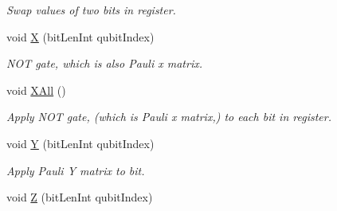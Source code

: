 \begin{DoxyCompactItemize}
\begin{DoxyCompactList}\small\item\em Swap values of two bits in register. \end{DoxyCompactList}\item 
void \hyperlink{classQrack_1_1Register_ab993acc64704e8e1c55526227b210037}{X} (bit\+Len\+Int qubit\+Index)\hypertarget{classQrack_1_1Register_ab993acc64704e8e1c55526227b210037}{}\label{classQrack_1_1Register_ab993acc64704e8e1c55526227b210037}

\begin{DoxyCompactList}\small\item\em N\+OT gate, which is also Pauli x matrix. \end{DoxyCompactList}\item 
void \hyperlink{classQrack_1_1Register_a63547410fb6375b7df4e4b8ec9d29d95}{X\+All} ()\hypertarget{classQrack_1_1Register_a63547410fb6375b7df4e4b8ec9d29d95}{}\label{classQrack_1_1Register_a63547410fb6375b7df4e4b8ec9d29d95}

\begin{DoxyCompactList}\small\item\em Apply N\+OT gate, (which is Pauli x matrix,) to each bit in register. \end{DoxyCompactList}\item 
void \hyperlink{classQrack_1_1Register_a0b9feb4910452ea495493a1eded7a46c}{Y} (bit\+Len\+Int qubit\+Index)\hypertarget{classQrack_1_1Register_a0b9feb4910452ea495493a1eded7a46c}{}\label{classQrack_1_1Register_a0b9feb4910452ea495493a1eded7a46c}

\begin{DoxyCompactList}\small\item\em Apply Pauli Y matrix to bit. \end{DoxyCompactList}\item 
void \hyperlink{classQrack_1_1Register_a1fc52f219837e51b323634c533305302}{Z} (bit\+Len\+Int qubit\+Index)\hypertarget{classQrack_1_1Register_a1fc52f219837e51b323634c533305302}{}\label{classQrack_1_1Register_a1fc52f219837e51b323634c533305302}


\end{DoxyCompactItemize}

